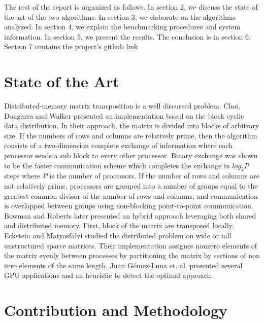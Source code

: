 \documentclass[conference]{IEEEtran}
\begin{document}
The rest of the report is organized as follows.
In section 2, we discuss the state of the art of the two algorithms.
In section 3, we elaborate on the algorithms analyzed.
In section 4, we explain the benchmarking procedures and system
information. In section 5, we present the results. The conclusion
is in section 6. Section 7 contains the project's github link

\section{State of the Art}

\iffalse
- Parallel Matrix Transpose Algorithms on Distributed Memory Concurrent
  Computers
- Adaptive Matrix Transpose Algorithms for Distributed Multicore Processors
- Efficient Distributed-Memory Parallel Matrix-Vector Multiplication with
  Wide or Tall Unstructured Sparse Matrices.
- In-Place Matrix Transposition on GPUs

\fi

Distributed-memory matrix transposition is a well discussed problem.
Choi, Dongarra and Walker \cite{b3} presented an implementation
based on the block cyclic data distribution. In their approach, the
matrix is divided into blocks of arbitrary size. If the numbers of rows and
columns are relatively prime, then the algorithm consists of a two-dimension
complete exchange of information where each processor sends a sub block
to every other processor. Binary exchange was shown to be the faster communication
scheme \cite{b4} which completes the exchange in $log_2 P$ steps where
$P$ is the number of processors. If the number of rows and columns
are not relatively prime, processors are grouped into a number of groups
equal to the greatest common divisor of the number of rows and columns, and
communication is overlapped between groups using
non-blocking point-to-point communication. Bowman and Roberts \cite{b5} later
presented an hybrid approach leveraging both shared and distributed memory.
First, block of the matrix are transposed locally. Eckstein and Matyasfalvi
\cite{b6} studied the distributed problem on wide or tall unstructured sparce matrices.
Their implementation assignes nonzero elements of the matrix evenly
between processes by partitioning the matrix by sections of non zero
elements of the same length. Juan Gómez-Luna et. al. \cite{b7} presented
several GPU applications and an heuristic to detect the optimal approach.

\section{Contribution and Methodology}
\end{document}
